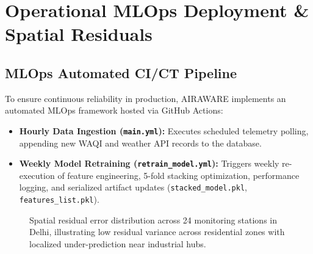 \documentclass[journal]{IEEEtran}
\begin{document}
\section{Operational MLOps Deployment \& Spatial Residuals}

\subsection{MLOps Automated CI/CT Pipeline}
To ensure continuous reliability in production, AIRAWARE implements an automated MLOps framework hosted via GitHub Actions:
\begin{itemize}
    \item \textbf{Hourly Data Ingestion (\texttt{main.yml}):} Executes scheduled telemetry polling, appending new WAQI and weather API records to the database.
    \item \textbf{Weekly Model Retraining (\texttt{retrain\_model.yml}):} Triggers weekly re-execution of feature engineering, 5-fold stacking optimization, performance logging, and serialized artifact updates (\texttt{stacked\_model.pkl}, \texttt{features\_list.pkl}).
\end{itemize}

\begin{figure}[t]
\centering
{}
\caption{Spatial residual error distribution across 24 monitoring stations in Delhi, illustrating low residual variance across residential zones with localized under-prediction near industrial hubs.}
\label{fig:spatial_residuals}
\end{figure}
\end{document}
